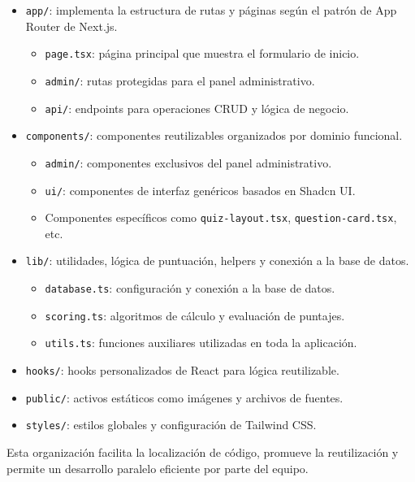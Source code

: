 \documentclass[12pt,a4paper]{report}
\begin{document}
\begin{itemize}[leftmargin=*]
    \item \texttt{app/}: implementa la estructura de rutas y páginas según el patrón de App Router de Next.js.
    \begin{itemize}
        \item \texttt{page.tsx}: página principal que muestra el formulario de inicio.
        \item \texttt{admin/}: rutas protegidas para el panel administrativo.
        \item \texttt{api/}: endpoints para operaciones CRUD y lógica de negocio.
    \end{itemize}
    
    \item \texttt{components/}: componentes reutilizables organizados por dominio funcional.
    \begin{itemize}
        \item \texttt{admin/}: componentes exclusivos del panel administrativo.
        \item \texttt{ui/}: componentes de interfaz genéricos basados en Shadcn UI.
        \item Componentes específicos como \texttt{quiz-layout.tsx}, \texttt{question-card.tsx}, etc.
    \end{itemize}
    
    \item \texttt{lib/}: utilidades, lógica de puntuación, helpers y conexión a la base de datos.
    \begin{itemize}
        \item \texttt{database.ts}: configuración y conexión a la base de datos.
        \item \texttt{scoring.ts}: algoritmos de cálculo y evaluación de puntajes.
        \item \texttt{utils.ts}: funciones auxiliares utilizadas en toda la aplicación.
    \end{itemize}
    
    \item \texttt{hooks/}: hooks personalizados de React para lógica reutilizable.
    \item \texttt{public/}: activos estáticos como imágenes y archivos de fuentes.
    \item \texttt{styles/}: estilos globales y configuración de Tailwind CSS.
\end{itemize}

Esta organización facilita la localización de código, promueve la reutilización y permite un desarrollo paralelo eficiente por parte del equipo.
\end{document}
